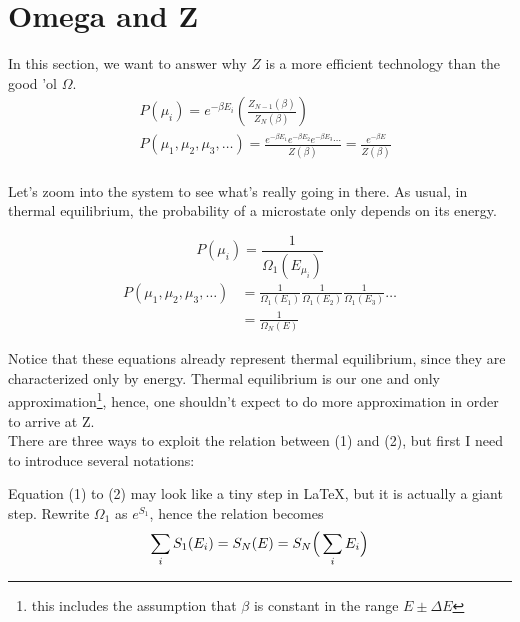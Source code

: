 


    \section{Omega and Z}
    \newcommand{\ThE}{thermal equilibrium}

        In this section, we want to answer why $Z$ is a more efficient technology than the good 'ol $\Omega$.
        \begin{align*}
            &P(\mu_i) = e^{-\beta E_i}
            \left( \frac{Z_{N-1}(\beta)}{Z_N(\beta)}\right)\\
            &P(\mu_1,\mu_2,\mu_3,\ldots) = \frac{e^{-\beta E_1} e^{-\beta E_2} e^{-\beta E_3} \cdots}{Z(\beta)}
                              = \frac{e^{-\beta E} }{Z(\beta)}\\
        \end{align*}

        Let's zoom into the system to see what's really going in there.
        As usual, in \ThE, the probability of a microstate only depends on its energy.

            \[P(\mu_i) = \frac1{\Omega_1(E_{\mu_i})} \]
        \begin{align}
            P(\mu_1,\mu_2,\mu_3,\ldots) &= \frac1{\Omega_1(E_1)}
                                \frac1{\Omega_1(E_2)}
                                \frac1{\Omega_1(E_3)}
                                \ldots \\
            &= \frac1{\Omega_N(E)}
        \end{align}

        Notice that these equations already represent thermal equilibrium,
        since they are characterized only by energy.
        Thermal equilibrium is our one and only approximation\footnote{this includes the assumption that $\beta$ is constant in the range $E\pm\Delta E$},
        hence, one shouldn't expect to do more approximation in order to arrive at Z.\\
        There are three ways to exploit the relation between (1) and (2), but first I need to introduce several notations:

        \newcommand{\aE}{\epsilon}
        \newcommand{\soi}{\sum_i}
        \newcommand{\Stothei}[1] {{\hat\pdc}^{#1} S_1(\aE)}
        Equation (1) to (2) may look like a tiny step in \LaTeX,
        but it is actually a giant step.
        Rewrite $\Omega_1$ as $e^{ S_1}$, hence the relation becomes
        \begin{equation}
            \label{eq:mainassumption}
            \soi S_1(E_i) = S_N(E) = S_N\Big(\soi E_i\Big) \\
        \end{equation}


